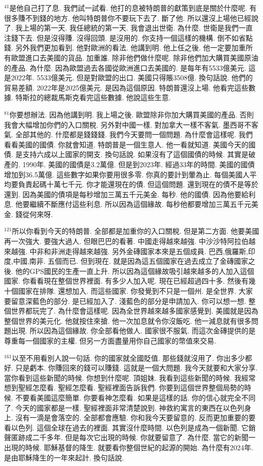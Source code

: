 \documentclass{book}
\begin{document}
$^{41}$是他自己打了息.
我們試一試看.
他打的息被特朗普的獻策到底是關於什麼呢.
有很多賺不到錢的地方.
他叫特朗普你不要玩下去了.
斷了他.
所以還沒上場他已經說了.
我上場的第一天.
我任總統的第一天.
我會退出世衛.
為什麼.
世衛是我們一直注錢下去.
但是沒得賺.
沒得回頭.
是沒用的.
你支持一個這樣的機構.
倒不如省點錢.
另外我們更加看到.
他對歐洲的看法.
他講到明.
他上任之後.
他一定要加重所有歐盟進口去美國的貨品.
加重誰.
除非他們做什麼呢.
除非他們加大購買美國原油的產品.
為什麼.
因為歐盟過去各國從歐洲進口去美國的.
是每年有5533億美元.
這是2022年.
5533億美元.
但是對歐盟的出口.
美國只得賬3508億.
換句話說.
他們的貿易差額.
2022年是2025億美元.
是因為這個原因.
特朗普還沒上場.
他看完這些數據.
特斯拉的總裁馬斯克看完這些數據.
他說這些生意.

$^{81}$你要想辦法.
因為他講到明.
我上場之後.
歐盟除非你加大購買美國的產品.
否則我會大幅增加你們的入口關稅.
另外對中國一樣.
對加拿大一樣不客氣.
墨西哥不客氣.
全部其他的.
什麼都是錢錢錢.
我們今天要問一個問題.
為什麼會這樣呢.
我們看看美國的國債.
你就會知道.
特朗普是一個生意人.
他一看就知道.
美國今天的國債.
是支持六成以上國家的開支.
換句話說.
如果沒有了這個國債的時候.
其實是破產的.
1990年.
美國的國債是3.2萬億.
但是到2023年.
經過33年的時間.
美國的國債增加到36.5萬億.
這些數字如果你要用很多零.
你真的要計到暈為止.
每個美國人平均要負責起碼十萬七千元.
你才能還現在的債.
但這個問題.
還到現在的債不是等於還到.
因為美國的債項是每秒增加三萬五千元美金.
每秒.
他的國債.
因為他要給利息.
他要繼續不斷應付這些利息.
所以因為這個緣故.
每秒他都要增加三萬五千元美金.
錢從何來呀.

$^{121}$所以你看到今天的特朗普.
全部都是加重你的入口關稅.
但是第二方面.
他要美國再一次強大.
要強大過人.
但眼巴巴的看著.
中國走得越來越強.
中沙沙特阿拉伯越來越強.
中非和非洲走得越來越強.
另外金磚國家本來是五個成員.
巴西,俄羅斯,印度,中國,南非.
五個而已.
但到現在.
就是因為這五個國家在過去成立了金磚國家之後.
他的GPS國民的生產一直上升.
所以因為這個緣故吸引越來越多的人加入這個國家.
你看看現在整個世界裡面.
有多少人加入呢.
現在已經超過四十多.
然後有幾十個國家在排隊.
還想加入.
而這些國家.
你發覺到不只是一個州.
是全世界.
大家要留意深藍色的部分.
是已經加入了.
淺藍色的部分是申請加入.
你可以想一想.
整個世界都玩完了.
為什麼會這樣呢.
因為全世界越來越多國家感覺到.
美國就是因為整個世界的美元化.
他就按住來搶.
他一次加息就令你沒飯吃.
他一減息就有很多問題出現.
所以因為這個緣故.
你全部看他做人.
國家很不服氣.
而這次金磚提供的是尊重每一個國家的主權.
但另一方面盡量用你自己國家的幣值來交易.

$^{161}$以至不用看別人說一句話.
你的國家就全國貶值.
那些錢就沒用了.
你出多少都好.
只是虧本.
你賺回來的錢可以賺錢.
這就是一個大問題.
我今天就要和大家分享.
當你看到這些新聞的時候.
你想到什麼呢.
頂姐妹.
我看到這些新聞的時候.
我經常想到聖經怎麼看.
聖經怎麼看.
聖經裡面告訴我們.
你要到這個世界整個局勢的時候.
不要看美國這麼簡單.
你要看神怎麼看.
如果是這樣的話.
你的信心就完全不同了.
今天的國家都是一樣.
聖經裡面非常清楚說到.
神救約寓言的東西在以色列身上.
沒有一滴是會落空的.
全部都會應驗.
你和我今天要留意的.
反而更加重要的要看以色列.
這個全球在過去的裡面.
其實沒什麼時間.
以色列是成為一個新聞.
它銷聲匿跡成二千多年.
但是每次它出現的時候.
你就要留意了.
為什麼.
當它的新聞一出現的時候.
耶穌基督的降生.
就要看你整個世紀的起源的開始.
為什麼有2024年.
是由耶穌降生的一年來起計.
換句話說.
\end{document}
